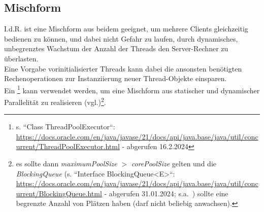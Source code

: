 \subsection*{Mischform}
I.d.R. ist eine Mischform aus beidem geeignet, um mehrere Clients gleichzeitig bedienen zu können, und dabei nicht Gefahr zu laufen, durch dynamisches, unbegrenztes Wachstum der Anzahl der Threads den Server-Rechner zu überlasten.\\
Eine Vorgabe vorinitialisierter Threads kann dabei die ansonsten benötigten Rechenoperationen zur Instanziierung neuer Thread-Objekte
einsparen.\\
Ein \footnote{
    s. ``Class ThreadPoolExecutor``: \url{https://docs.oracle.com/en/java/javase/21/docs/api/java.base/java/util/concurrent/ThreadPoolExecutor.html} - abgerufen 16.2.2024
} kann verwendet werden, um eine Mischform aus statischer und dynamischer Parallelität zu realisieren (vgl.\cite[164 u. 302]{Oec22})\footnote{
    es sollte dann \textit{maximumPoolSize} $>$ \textit{corePoolSize} gelten und die \textit{BlockingQueue} (s. ``Interface BlockingQueue<E>``: \url{https://docs.oracle.com/en/java/javase/21/docs/api/java.base/java/util/concurrent/BlockingQueue.html} - abgerufen 31.01.2024; s.a.~\cite[146]{Oec22}) sollte eine begrenzte Anzahl von Plätzen haben (darf nicht beliebig anwachsen).
}.